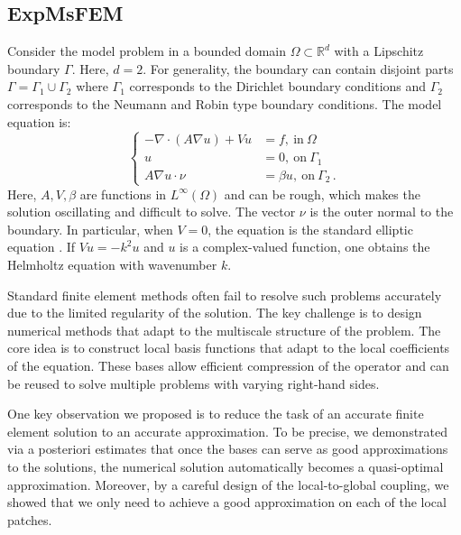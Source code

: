 \documentclass[12pt]{caltech_thesis}
\numberwithin{equation}{section}
\begin{document}
\subsection{ExpMsFEM}
\label{subsec:ExpMsFEM}
Consider the model problem in a bounded domain $\Omega \subset \mathbb{R}^d$ with a Lipschitz boundary $\Gamma$. Here, $d=2$. For generality, the boundary can contain disjoint parts $\Gamma = \Gamma_1\cup \Gamma_2$ where $\Gamma_1$ corresponds to the Dirichlet boundary conditions and $\Gamma_2$ corresponds to the Neumann and Robin type boundary conditions. 
The model equation is: 
\begin{equation}
\left\{
\begin{aligned}
-\nabla \cdot(A\nabla u)+Vu&=f, \ \text{in} \ \Omega\\
u&=0, \ \text{on} \ \Gamma_1\\
A\nabla u\cdot\nu&=\beta u, \ \text{on} \  \Gamma_2 \, .
\end{aligned}
\right.
\end{equation}
Here, $A, V,\beta$ are functions in $L^{\infty}(\Omega)$ and can be rough, which makes the solution oscillating and difficult to solve. The vector $\nu$ is the outer normal to the boundary. 
In particular, when $V=0$, the equation is the standard elliptic equation \cite{chen2021exponential}. If $Vu=-k^2u$ and $u$ is a complex-valued function, one obtains the Helmholtz equation \cite{chen2023exponentially} with wavenumber $k$.

Standard finite element methods often fail to resolve such problems accurately due to the limited regularity of the solution. The key challenge is to design numerical methods that adapt to the multiscale structure of the problem. The core idea is to construct local basis functions that adapt to the local coefficients of the equation. These bases allow efficient compression of the operator and can be reused to solve multiple problems with varying right-hand sides.

One key observation we proposed is to reduce the task of an accurate finite element solution to an accurate approximation. To be precise, we demonstrated via a posteriori estimates that once the bases can serve as good approximations to the solutions, the numerical solution automatically becomes a quasi-optimal approximation. Moreover, by a careful design of the local-to-global coupling, we showed that we only need to achieve a good approximation on each of the local patches.
\end{document}
